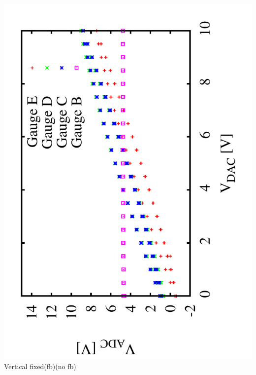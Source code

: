\documentclass[a4paper,11pt]{book}
\begin{document}
 \includegraphics[angle=-90,scale=0.15]{image_ai_02.pdf}\\
 Vertical fixed\hspace{1.6cm}(fb)\hspace{3.0cm}(no fb)\\
\end{document}
